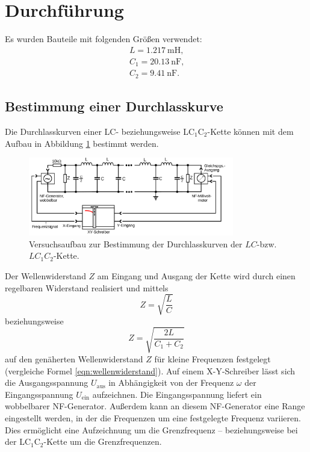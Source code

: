 \section{Durchführung}
\label{sec:Durchführung}

Es wurden Bauteile mit folgenden Größen verwendet:
\begin{gather*}
	L = \SI{1.217}{\milli\henry} \text{,} \\
	C_1 = \SI{20.13}{\nano\farad} \text{,} \\
	C_2 = \SI{9.41}{\nano\farad} \text{.}
\end{gather*}


\subsection{Bestimmung einer Durchlasskurve}
Die Durchlasskurven einer LC- beziehungsweise LC$_1$C$_2$-Kette können
mit dem Aufbau in Abbildung \ref{fig:durchlasskurve} bestimmt werden.
\begin{figure}
	\centering
	\includegraphics[width=0.8\textwidth]{Bilder/durchlasskurve.png}
	\caption{Versuchsaufbau zur Bestimmung der Durchlasskurven der $LC$-bzw. $LC_1C_2$-Kette. \cite{Anleitung}}
	\label{fig:durchlasskurve}
\end{figure}
Der Wellenwiderstand $Z$ am Eingang und Ausgang der Kette wird durch einen
regelbaren Widerstand realisiert und mittels
\begin{equation}
	Z = \sqrt{\frac{L}{C}}
\end{equation}
beziehungsweise
\begin{equation}
	Z = \sqrt{\frac{2L}{C_1+C_2}}
\end{equation}
auf den genäherten Wellenwiderstand $Z$ für kleine Frequenzen festgelegt (vergleiche Formel \eqref{eqn:wellenwiderstand}).
Auf einem X-Y-Schreiber lässt sich die Ausgangsspannung $U_{\text{aus}}$ in Abhängigkeit von der Frequenz $\omega$ der Eingangsspannung $U_{\text{ein}}$ aufzeichnen.
Die Eingangsspannung liefert ein wobbelbarer NF-Generator.
Außerdem kann an diesem NF-Generator eine Range eingestellt werden, in der die Frequenzen um eine festgelegte Frequenz variieren.
Dies ermöglicht eine Aufzeichnung um die Grenzfrequenz -- beziehungsweise
bei der LC$_1$C$_2$-Kette um die Grenzfrequenzen.

